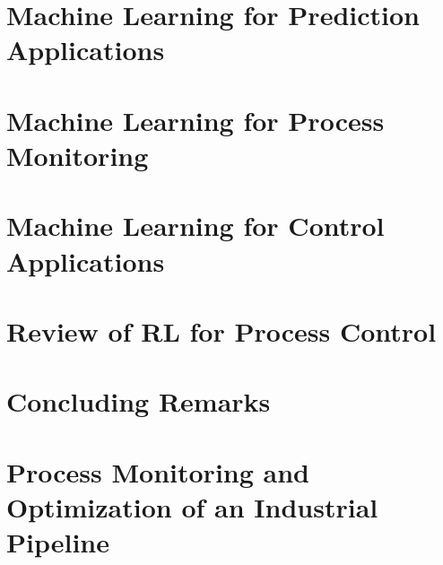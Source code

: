 \documentclass[12pt]{report}
\begin{document}






\chapter{Machine Learning for Prediction Applications}


\chapter{Machine Learning for Process Monitoring}


\chapter{Machine Learning for Control Applications}


\chapter{Review of RL for Process Control}


\chapter{Concluding Remarks}


\printbibliography

\clearpage
{}%
\renewcommand*{\thepage}{A\arabic{page}}

\appendix 

\chapter{Process Monitoring and Optimization of an Industrial Pipeline}


% 

% 
\end{document}
